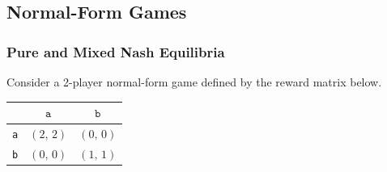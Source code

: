 \setcounter{section}{2}
\subsection{Normal-Form Games}
\subsubsection{Pure and Mixed Nash Equilibria}

Consider a 2-player normal-form game defined by the reward matrix below.
\begin{table}[H]
  \centering
  \begin{tabular}{|c|c|c|}
    \hline
           & $\texttt{a}$       & $\texttt{b}$       \\\hline
    \texttt{a}    & $(2,\,2)$ & $(0,\,0)$ \\\hline
    \texttt{b}    & $(0,\,0)$ & $(1,\,1)$ \\\hline
  \end{tabular}
\end{table}
